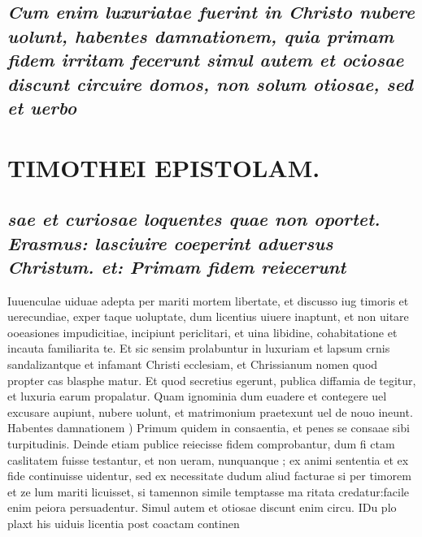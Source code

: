\documentclass{article}
\begin{document}
\begin{pages}
\subsection*{\textit{Cum enim luxuriatae fuerint in Christo nubere uolunt, habentes damnationem, quia primam fidem irritam fecerunt simul autem et ociosae discunt circuire domos, non solum otiosae, sed et uerbo}}
\section*{TIMOTHEI EPISTOLAM. }
\marginpar{[ p.131 ]}
{}
\subsection*{\textit{sae et curiosae loquentes quae non oportet. Erasmus: lasciuire coeperint aduersus Christum. et: Primam fidem reiecerunt }}\pstart Iuuenculae uiduae adepta per mariti mortem libertate, et discusso iug timoris et uerecundiae, exper taque uoluptate, dum licentius uiuere inaptunt, et non uitare ooeasiones impudicitiae, incipiunt periclitari, et uina libidine, cohabitatione et incauta familiarita te. Et sic sensim prolabuntur in luxuriam et lapsum crnis sandalizantque et infamant Christi ecclesiam, et Chrissianum nomen quod propter cas blasphe matur. Et quod secretius egerunt, publica diffamia de tegitur, et luxuria earum propalatur. Quam ignominia dum euadere et contegere uel excusare aupiunt, nubere uolunt, et matrimonium praetexunt uel de nouo ineunt.  \pend\pstart Habentes damnationem ) Primum quidem in consaentia, et penes se consaae sibi turpitudinis. Deinde etiam publice reiecisse fidem comprobantur, dum fi ctam caslitatem fuisse testantur, et non ueram, nunquanque ; ex animi sententia et ex fide continuisse uidentur, sed ex necessitate dudum aliud facturae si per timorem et ze lum mariti licuisset, si tamennon simile temptasse ma ritata credatur:facile enim peiora persuadentur.  \pend\pstart Simul autem et otiosae discunt enim circu. IDu plo plaxt his uiduis licentia post coactam continen  \pend

\end{pages}
\end{document}
